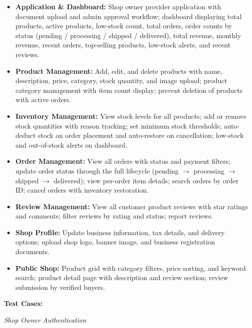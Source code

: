 \documentclass[12pt,a4paper]{report}
\begin{document}
\begin{itemize}[leftmargin=1.5cm]
  \item \textbf{Application \& Dashboard:} Shop owner provider application with document upload and admin approval workflow; dashboard displaying total products, active products, low-stock count, total orders, order counts by status (pending / processing / shipped / delivered), total revenue, monthly revenue, recent orders, top-selling products, low-stock alerts, and recent reviews.
  \item \textbf{Product Management:} Add, edit, and delete products with name, description, price, category, stock quantity, and image upload; product category management with item count display; prevent deletion of products with active orders.
  \item \textbf{Inventory Management:} View stock levels for all products; add or remove stock quantities with reason tracking; set minimum stock thresholds; auto-deduct stock on order placement and auto-restore on cancellation; low-stock and out-of-stock alerts on dashboard.
  \item \textbf{Order Management:} View all orders with status and payment filters; update order status through the full lifecycle (pending $\to$ processing $\to$ shipped $\to$ delivered); view per-order item details; search orders by order ID; cancel orders with inventory restoration.
  \item \textbf{Review Management:} View all customer product reviews with star ratings and comments; filter reviews by rating and status; report reviews.
  \item \textbf{Shop Profile:} Update business information, tax details, and delivery options; upload shop logo, banner image, and business registration documents.
  \item \textbf{Public Shop:} Product grid with category filters, price sorting, and keyword search; product detail page with description and review section; review submission by verified buyers.
\end{itemize}

\textbf{Test Cases:}

\textit{Shop Owner Authentication}
\end{document}
